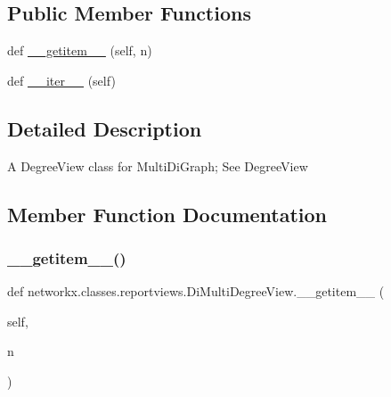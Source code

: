\subsection*{Public Member Functions}
\begin{DoxyCompactItemize}
\item 
def \hyperlink{classnetworkx_1_1classes_1_1reportviews_1_1DiMultiDegreeView_a9155a4a0403c3a716a98b04a74d2e3ba}{\+\_\+\+\_\+getitem\+\_\+\+\_\+} (self, n)
\item 
def \hyperlink{classnetworkx_1_1classes_1_1reportviews_1_1DiMultiDegreeView_ab40278a07572fa262aad1ff4eb9eb4a0}{\+\_\+\+\_\+iter\+\_\+\+\_\+} (self)
\end{DoxyCompactItemize}


\subsection{Detailed Description}
\begin{DoxyVerb}A DegreeView class for MultiDiGraph; See DegreeView\end{DoxyVerb}
 

\subsection{Member Function Documentation}
\mbox{\label{classnetworkx_1_1classes_1_1reportviews_1_1DiMultiDegreeView_a9155a4a0403c3a716a98b04a74d2e3ba}} 
\subsubsection{\texorpdfstring{\+\_\+\+\_\+getitem\+\_\+\+\_\+()}{\_\_getitem\_\_()}}
{\footnotesize\ttfamily def networkx.\+classes.\+reportviews.\+Di\+Multi\+Degree\+View.\+\_\+\+\_\+getitem\+\_\+\+\_\+ (\begin{DoxyParamCaption}\item[{}]{self,  }\item[{}]{n }\end{DoxyParamCaption})}

